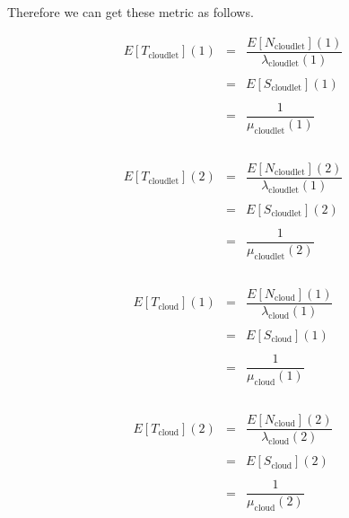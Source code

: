 \documentclass[10pt,a4paper]{article}
\begin{document}
Therefore we can get these metric as follows.

\begin{equation}
\begin{array} {rcl} 
E[T_{\text{cloudlet}}](1) & = & \dfrac{E[N_{\text{cloudlet}}](1)}{\lambda_{\text{cloudlet}}(1)} \\\\

& = & E[S_{\text{cloudlet}}](1) \\\\

& = & \dfrac{1}{\mu_{\text{cloudlet}}(1)} \\\\
\end{array}
\end{equation}

\begin{equation}
\begin{array} {rcl} 
E[T_{\text{cloudlet}}](2) & = & \dfrac{E[N_{\text{cloudlet}}](2)}{\lambda_{\text{cloudlet}}(1)} \\\\

& = & E[S_{\text{cloudlet}}](2) \\\\

& = & \dfrac{1}{\mu_{\text{cloudlet}}(2)} \\\\
\end{array}
\end{equation}

\begin{equation}
\begin{array} {rcl} 
E[T_{\text{cloud}}](1) & = & \dfrac{E[N_{\text{cloud}}](1)}{\lambda_{\text{cloud}}(1)} \\\\

& = & E[S_{\text{cloud}}](1) \\\\

& = & \dfrac{1}{\mu_{\text{cloud}}(1)} \\\\
\end{array}
\end{equation}

\begin{equation}
\begin{array} {rcl} 
E[T_{\text{cloud}}](2) & = & \dfrac{E[N_{\text{cloud}}](2)}{\lambda_{\text{cloud}}(2)} \\\\

& = & E[S_{\text{cloud}}](2) \\\\

& = & \dfrac{1}{\mu_{\text{cloud}}(2)} \\\\
\end{array}
\end{equation}
\end{document}
